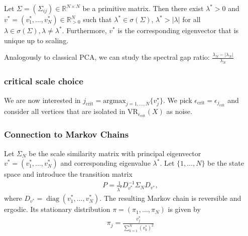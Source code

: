 

\begin{Thm}
    Let $\Sigma=(\Sigma_{ij})\in\mathbb{R}^{N\times N}$ be a primitive matrix. Then there exist $\lambda^*>0$ and $v^*=(v^*_1,\dots,v^*_N)\in\mathbb{R}^{N}_{>0}$ such that $\lambda^*\in\sigma(\Sigma)$, $\lambda^*>|\lambda|$ for all $\lambda\in\sigma(\Sigma),\lambda\ne\lambda^*$. Furthermore, $v^*$ is the corresponding eigenvector that is unique up to scaling.
\end{Thm}

\begin{Rem}
    Analogously to classical PCA, we can study the spectral gap ratio: $\frac{\lambda_N-|\lambda_N|}{\lambda_N}$
\end{Rem}

\subsubsection*{critical scale choice}

We are now interested in $j_{\text{crit}}=\text{argmax}_{j=1,\dots,N}\{v^{\star}_j\}$. We pick $\epsilon_{\text{crit}}=\epsilon_{j_{\text{crit}}}$ and consider all vertices that are isolated in $\text{VR}_{\epsilon_{\text{crit}}}(X)$ as noise.


\subsubsection*{Connection to Markov Chains}


Let $\Sigma_N$ be the scale similarity matrix with principal eigenvector $v^*=(v^*_1,\dots,v^*_N)$ and corresponding eigenvalue $\lambda^*$. Let $\{1,\dots,N\}$ be the state space and introduce the transition matrix
\begin{align*}
    P=\frac{1}{\lambda^*}D_{v^*}^{-1}\Sigma_ND_{v^*},
\end{align*}
where $D_{v^*}=\operatorname{diag}(v^*_1,\dots,v^*_N)$. The resulting Markov chain is reversible and ergodic. Its stationary distribution $\pi=(\pi_1,\dots,\pi_N)$ is given by
\begin{align*}
    \pi_j=\frac{v^*_j}{\sum_{k=1}^{N}(v^*_k)^2}
\end{align*}

